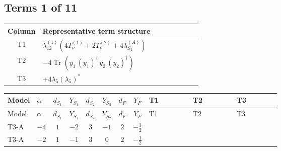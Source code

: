 \documentclass[8pt]{article}
\begin{document}
\begin{landscape}
\subsection*{Terms 1 of 11}
\begin{center}
\begin{tabular}{@{}c >{\raggedright\arraybackslash}p{0.82\linewidth}@{}}
\toprule
Column & Representative term structure \\
\midrule
T1 & \(\displaystyle {\lambda_{12}^{(1)}} (4 T_{\nu}^{(1)}+2 T_{\nu}^{(2)}+4 {\lambda_{S_2}^{(A)}})\) \\
\midrule
T2 & \(\displaystyle -4 \operatorname{Tr}\!\left({y_1}\,\left({y_1}\right)^{\dagger}\,{y_2}\,\left({y_2}\right)^{\dagger}\right)\) \\
\midrule
T3 & \(\displaystyle +4 {\lambda_5} \left({\lambda_5}\right)^{*}\) \\
\midrule
\bottomrule
\end{tabular}
\end{center}
\smallskip
\tiny
\begin{longtable}{@{}llcccccc >{\raggedright\arraybackslash}p{0.21\linewidth} >{\raggedright\arraybackslash}p{0.21\linewidth} >{\raggedright\arraybackslash}p{0.21\linewidth}@{}}
\toprule
Model & $\alpha$ & $d_{S_1}$ & $Y_{S_1}$ & $d_{S_2}$ & $Y_{S_2}$ & $d_F$ & $Y_F$ & T1 & T2 & T3 \\
\midrule
\endfirsthead
\toprule
Model & $\alpha$ & $d_{S_1}$ & $Y_{S_1}$ & $d_{S_2}$ & $Y_{S_2}$ & $d_F$ & $Y_F$ & T1 & T2 & T3 \\
\midrule
\endhead
T3-A & $-4$ & $1$ & $-2$ & $3$ & $-1$ & $2$ & $-\frac{3}{2}$ & \scriptsize\adjustbox{max width=\linewidth}{$\begin{gathered} {\lambda_{12}^{(1)}} (4 T_{\nu}^{(1)}+2 T_{\nu}^{(2)}+4 {\lambda_{S_2}^{(A)}})\end{gathered}$} & \scriptsize\adjustbox{max width=\linewidth}{$\begin{gathered} -4 \operatorname{Tr}\!\left({y_1}\,\left({y_1}\right)^{\dagger}\,{y_2}\,\left({y_2}\right)^{\dagger}\right)\end{gathered}$} & \scriptsize\adjustbox{max width=\linewidth}{$\begin{gathered} +4 {\lambda_5} \left({\lambda_5}\right)^{*}\end{gathered}$} \\
\midrule
T3-A & $-2$ & $1$ & $-1$ & $3$ & $0$ & $2$ & $-\frac{1}{2}$ & \scriptsize\adjustbox{max width=\linewidth}{$\begin{gathered} {\lambda_{12}^{(1)}} (4 T_{\nu}^{(1)}+2 T_{\nu}^{(2)}+4 {\lambda_{S_2}^{(A)}})\end{gathered}$} & \scriptsize\adjustbox{max width=\linewidth}{$\begin{gathered} -4 \operatorname{Tr}\!\left({y_1}\,\left({y_1}\right)^{\dagger}\,{y_2}\,\left({y_2}\right)^{\dagger}\right)\end{gathered}$} & \scriptsize\adjustbox{max width=\linewidth}{$\begin{gathered} +4 {\lambda_5} \left({\lambda_5}\right)^{*}\end{gathered}$} \\

\end{longtable}
\end{landscape}
\end{document}
